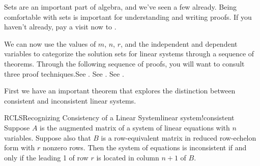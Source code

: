 %
%
Sets are an important part of algebra, and we've seen a few already.  Being comfortable with sets is important for understanding and writing proofs.  If you haven't already, pay a visit now to .\par
%
We can now use the values of $m$, $n$, $r$, and the independent and dependent variables to categorize the solution sets for linear systems through a sequence of theorems.
%
{Through the following sequence of proofs, you will want to consult three proof techniques.}{See .}
{\relax}{See .}
{\relax}{See .}\par
%
First we have an important theorem that explores the distinction between consistent and inconsistent linear systems.
%
\begin{theorem}{RCLS}{Recognizing Consistency of a Linear System}{linear system!consistent}
Suppose $A$ is the augmented matrix of a system of linear equations with $n$ variables.  Suppose also that $B$ is a row-equivalent matrix in reduced row-echelon form with $r$ nonzero rows.  Then the system of equations is inconsistent if and only if the leading 1 of row $r$ is located in column $n+1$ of $B$.
\end{theorem}
%
